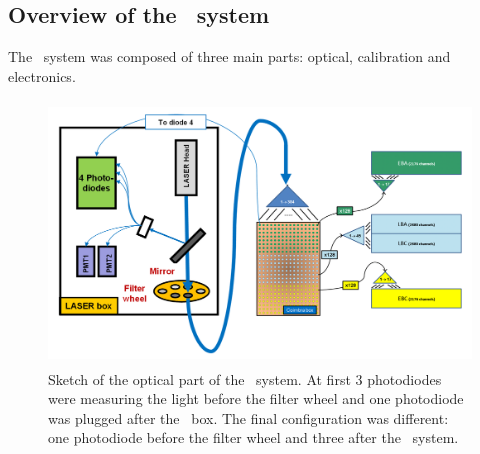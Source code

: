 


\subsection{Overview of the \lasi~system}

The \lasi~system \cite{ref:lasercalvet} was composed of three main parts: optical, calibration and electronics.

\begin{figure}[htbp]
\centering
\includegraphics[height=7cm]{figures/FullSystem.png}
\caption{Sketch of the optical part of the \lasi~system. At first 3 photodiodes were measuring the light before the filter wheel and one photodiode was plugged after the \coimbra~box. The final configuration was different: one photodiode before the filter wheel and three after the \coimbra~system.}\label{fig:lasaoptical}
\end{figure}


